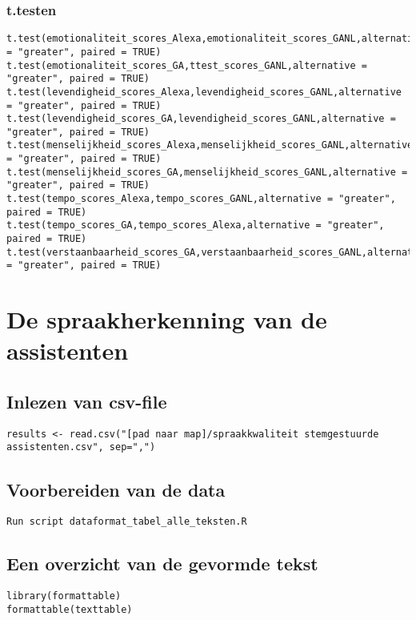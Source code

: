 \subsubsection{t.testen}
\begin{lstlisting}
t.test(emotionaliteit_scores_Alexa,emotionaliteit_scores_GANL,alternative = "greater", paired = TRUE)
t.test(emotionaliteit_scores_GA,ttest_scores_GANL,alternative = "greater", paired = TRUE)
t.test(levendigheid_scores_Alexa,levendigheid_scores_GANL,alternative = "greater", paired = TRUE)
t.test(levendigheid_scores_GA,levendigheid_scores_GANL,alternative = "greater", paired = TRUE)
t.test(menselijkheid_scores_Alexa,menselijkheid_scores_GANL,alternative = "greater", paired = TRUE)
t.test(menselijkheid_scores_GA,menselijkheid_scores_GANL,alternative = "greater", paired = TRUE)
t.test(tempo_scores_Alexa,tempo_scores_GANL,alternative = "greater", paired = TRUE)
t.test(tempo_scores_GA,tempo_scores_Alexa,alternative = "greater", paired = TRUE)
t.test(verstaanbaarheid_scores_GA,verstaanbaarheid_scores_GANL,alternative = "greater", paired = TRUE)
\end{lstlisting}

\section{De spraakherkenning van de assistenten}
\subsection{Inlezen van csv-file}
\begin{lstlisting}
results <- read.csv("[pad naar map]/spraakkwaliteit stemgestuurde assistenten.csv", sep=",")
\end{lstlisting}
\subsection{Voorbereiden van de data}
\begin{lstlisting}
Run script dataformat_tabel_alle_teksten.R
\end{lstlisting}

\subsection{Een overzicht van de gevormde tekst}
\begin{lstlisting}
library(formattable)
formattable(texttable)
\end{lstlisting}
